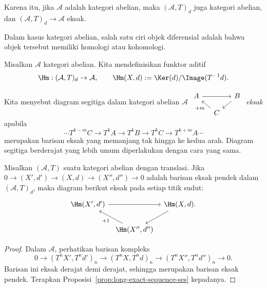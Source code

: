 Karena itu, jika $\mathcal{A}$ adalah kategori abelian, maka
$(\mathcal{A},T)_d$ juga kategori abelian, dan
$(\mathcal{A},T)_d\to\mathcal{A}$ eksak.

Dalam kasus kategori abelian, salah satu ciri objek diferensial adalah bahwa
objek tersebut memiliki homologi atau kohomologi.

\begin{definition}
	Misalkan $\mathcal{A}$ kategori abelian. Kita mendefinisikan funktor aditif
	\[ \Hm:(\mathcal{A},T)_d\to\mathcal{A},\qquad
	   \Hm(X,d):=\Ker(d)/\Image(T^{-1}d). \]
\end{definition}

Kita menyebut diagram segitiga dalam kategori abelian $\mathcal{A}$
$\begin{tikzcd}[column sep=small, row sep=small]
	A \arrow[rr] & & B \arrow[ld] \\
	& C \arrow[lu, "+m"] &
\end{tikzcd}$
\emph{eksak} apabila
\[ \cdots T^{k-m}C\to T^kA\to T^kB\to T^kC\to T^{k+m}A\cdots \]
merupakan barisan eksak yang memanjang tak hingga ke kedua arah. Diagram
segitiga berderajat yang lebih umum diperlakukan dengan cara yang sama.

\begin{lemma}\label{prop:diff-obj-triangle}
	Misalkan $(\mathcal{A},T)$ suatu kategori abelian dengan translasi. Jika
	$0\to(X',d')\to(X,d)\to(X'',d'')\to0$ adalah barisan eksak pendek dalam
	$(\mathcal{A},T)_d$, maka diagram berikut eksak pada setiap titik sudut:
	\[\begin{tikzcd}[column sep=tiny]
		\Hm(X',d') \arrow[rr] & & \Hm(X,d) \arrow[ld] . \\
		& \Hm(X'',d'') \arrow[lu, "{+1}"] &
	\end{tikzcd}\]
\end{lemma}
\begin{proof}
	Dalam $\mathcal{A}$, perhatikan barisan kompleks
	\[ 0\to(T^nX',T^nd')_n\to(T^nX,T^nd)_n
	   \to(T^nX'',T^nd'')_n\to0. \]
	Barisan ini eksak derajat demi derajat, sehingga merupakan barisan eksak
	pendek. Terapkan Proposisi~\ref{prop:long-exact-sequence-ses} kepadanya.
\end{proof}

